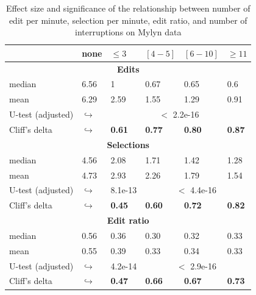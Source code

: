 \documentclass[times]{smrauth}
\begin{document}
\begin{table}[ht!]
\tiny
\renewcommand{\arraystretch}{1.3}
\caption{Effect size and significance of the relationship between number of edit per minute, selection per minute, edit ratio, and number of interruptions on Mylyn data} 
\label{tbl:p_value}
\centering
\begin{tabular}{l | p{0.75cm} | p{1.2cm} | p{1.2cm} | p{1.2cm} |p{1.2cm}} 

   & none & $\leq 3$ & $[4 - 5]$ & $[6 - 10]$ & $\geq 11$  \\  
  \hline
  \multicolumn{6}{c}{\textbf{Edits}} \\
  \hline
  median & 6.56 & 1 & 0.67 & 0.65 & 0.6	 \\
  \cline{2-6} 
  mean & 6.29 &	2.59 & 1.55 & 1.29 & 0.91  \\ 
   \cline{3-6} 
  U-test (adjusted) & $\hookrightarrow$ & \multicolumn{4}{c}{$<$ 2.2e-16} \\
  \cline{3-6} 
  Cliff's delta & $\hookrightarrow$	& \textbf{0.61} & \textbf{0.77} & \textbf{0.80} & \textbf{0.87}    \\
  \hline
  
  
  \multicolumn{6}{c}{\textbf{Selections}} \\
  \hline 
  median & 4.56 & 2.08 & 1.71 & 1.42 & 1.28 \\
  \cline{2-6} 
  mean & 4.73 &	2.93 & 2.26 & 1.79 & 1.54  \\ 
     \cline{3-6} 
    U-test (adjusted) & $\hookrightarrow$ & 8.1e-13 & \multicolumn{3}{c}{$<$ 4.4e-16} \\
    
  \cline{3-6} 
  Cliff's delta & $\hookrightarrow$	& \textbf{0.45} & \textbf{0.60} & \textbf{0.72} & \textbf{0.82} \\  
\hline


  \multicolumn{6}{c}{\textbf{Edit ratio}} \\
  \hline 
  median & 0.56 & 0.36 & 0.30 & 0.32 & 0.33 \\
  \cline{2-6} 
  mean & 0.55 & 0.39 & 0.33 & 0.34 & 0.33 \\ 
  \cline{3-6} 
     \cline{3-6} 
    U-test (adjusted) & $\hookrightarrow$ & 4.2e-14& \multicolumn{3}{c}{$<$ 2.9e-16} \\
    \cline{3-6} 
    Cliff's delta & $\hookrightarrow$ & \textbf{0.47} & \textbf{0.66} & \textbf{0.67} & \textbf{0.73} \\ 
\hline

\end{tabular}
\end{table}
\end{document}
